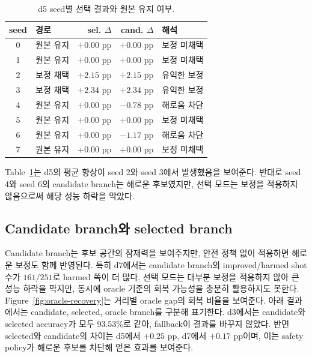 \documentclass[aps,prd,12pt,twocolumn,superscriptaddress,floatfix,longbibliography]{revtex4-2}
\newcommand{\thesiscaptionfont}{\footnotesize}
\begin{document}
\begin{table}[!tbp]
\caption{\thesiscaptionfont d5 seed별 선택 결과와 원본 유지 여부.}
\label{tab:d5-fallback}
\centering
\scriptsize
\setlength{\tabcolsep}{2.4pt}
\begin{tabular*}{\columnwidth}{@{\extracolsep{\fill}}clrrl}
\toprule
seed & 경로 & sel. \(\Delta\) & cand. \(\Delta\) & 해석 \\
\midrule
0 & 원본 유지 & \(+0.00\) pp & \(+0.00\) pp & 보정 미채택 \\
1 & 원본 유지 & \(+0.00\) pp & \(+0.00\) pp & 보정 미채택 \\
2 & 보정 채택 & \(+2.15\) pp & \(+2.15\) pp & 유익한 보정 \\
3 & 보정 채택 & \(+2.34\) pp & \(+2.34\) pp & 유익한 보정 \\
4 & 원본 유지 & \(+0.00\) pp & \(-0.78\) pp & 해로움 차단 \\
5 & 원본 유지 & \(+0.00\) pp & \(+0.00\) pp & 보정 미채택 \\
6 & 원본 유지 & \(+0.00\) pp & \(-1.17\) pp & 해로움 차단 \\
7 & 원본 유지 & \(+0.00\) pp & \(+0.00\) pp & 보정 미채택 \\
\bottomrule
\end{tabular*}
\end{table}

Table~\ref{tab:d5-fallback}는 d5의 평균 향상이 seed 2와 seed 3에서 발생했음을
보여준다. 반대로 seed 4와 seed 6의 candidate branch는 해로운 후보였지만,
선택 모드는 보정을 적용하지 않음으로써 해당 성능 하락을 막았다.

\subsection{Candidate branch와 selected branch}

Candidate branch는 후보 공간의 잠재력을 보여주지만, 안전 정책 없이 적용하면
해로운 보정도 함께 반영된다. 특히 d7에서는 candidate branch의 improved/harmed
shot 수가 \(161/251\)로 harmed 쪽이 더 많다. 선택 모드는 대부분 보정을
적용하지 않아 큰 성능 하락을 막지만, 동시에 oracle 기준의 회복 가능성을 충분히
활용하지도 못한다. Figure~\ref{fig:oracle-recovery}는 거리별 oracle gap의 회복
비율을 보여준다. 아래 결과에서는 candidate, selected, oracle branch를 구분해
표기한다.
d3에서는 candidate와 selected accuracy가 모두 93.53\%로 같아, fallback이 결과를
바꾸지 않았다. 반면 selected와 candidate의 차이는 d5에서 \(+0.25\) pp, d7에서
\(+0.17\) pp이며, 이는 safety policy가 해로운 후보를 차단해 얻은 효과를 보여준다.
\end{document}
